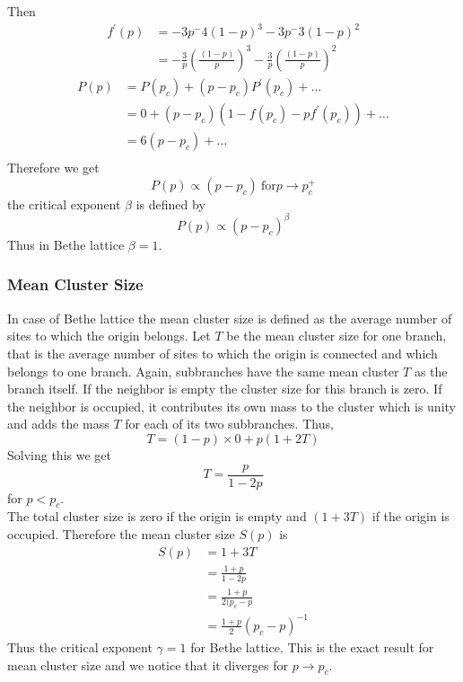 	Then
	\begin{align}
		f^\prime(p) &= -3p^-4 (1-p)^3 - 3 p^-3 (1-p)^2 \nonumber \\
		&= -\frac{3}{p} \left(\frac{(1-p)}{p}\right)^3 -\frac{3}{p} \left(\frac{(1-p)}{p}\right)^2
	\end{align}
	\begin{align}
		P(p) &= P(p_c) + (p-p_c) P^\prime(p_c) + \ldots \\
		&= 0 + (p-p_c) \left(1-f(p_c) - p f^\prime(p_c)\right) + \ldots \\
		&= 6(p-p_c) + \ldots \\
	\end{align}
	Therefore we get
	\begin{equation}
		P(p) \propto (p-p_c) \ \text{for} p \rightarrow p_c^+
	\end{equation}
	the critical exponent $\beta$ is defined by
	\begin{equation}
	P(p) \propto (p-p_c)^\beta
	\end{equation}
	Thus in Bethe lattice $\beta = 1$.
	\subsubsection{Mean Cluster Size}
	In case of Bethe lattice the mean cluster size is defined as the average number of sites to which the origin belongs. Let $T$ be the mean cluster size for one branch, that is the average number of sites to which the origin is connected and which belongs to one branch. Again, subbranches have the same mean cluster $T$ as the branch itself. If the neighbor is empty the cluster size for this branch is zero. If the neighbor is occupied, it contributes its own mass to the cluster which is unity and adds the mass $T$ for each of its two subbranches. Thus,
	\begin{equation}
		T = (1-p) \times 0 + p(1+2T)
	\end{equation}
	Solving this we get
	\begin{equation}
		T = \frac{p}{1 - 2p}
	\end{equation}
	for $p<p_c$. \\
	The total cluster size is zero if the origin is empty and $(1+3T)$ if the origin is occupied. Therefore the mean cluster size $S(p)$ is
	\begin{align}
		S(p) &= 1 + 3 T \\
		     &= \frac{1+p}{1-2p} \nonumber\\
   		     &= \frac{1+p}{2(p_c-p} \nonumber \\
   		     &=\frac{1+p}{2} (p_c - p)^{-1}
	\end{align}
	Thus the critical exponent $\gamma = 1$ for Bethe lattice. This is the exact result for mean cluster size and we notice that it diverges for $p\rightarrow p_c$.
